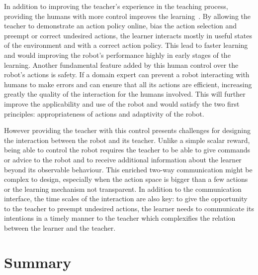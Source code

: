 In addition to improving the teacher's experience in the teaching process, providing the humans with more control improves the learning~\citep{thomaz2008teachable,chernova2009interactive}. By allowing the teacher to demonstrate an action policy online, bias the action selection and preempt or correct undesired actions, the learner interacts mostly in useful states of the environment and with a correct action policy. This lead to faster learning and would improving the robot's performance highly in early stages of the learning. Another fundamental feature added by this human control over the robot's actions is safety. If a domain expert can prevent a robot interacting with humans to make errors and can ensure that all its actions are efficient, increasing greatly the quality of the interaction for the humans involved. This will further improve the applicability and use of the robot and would satisfy the two first principles: appropriateness of actions and adaptivity of the robot.

However providing the teacher with this control presents challenges for designing the interaction between the robot and its teacher. Unlike a simple scalar reward, being able to control the robot requires the teacher to be able to give commands or advice to the robot and to receive additional information about the learner beyond its observable behaviour. This enriched two-way communication might be complex to design, especially when the action space is bigger than a few actions or the learning mechanism not transparent. In addition to the communication interface, the time scales of the interaction are also key: to give the opportunity to the teacher to preempt undesired actions, the learner needs to communicate its intentions in a timely manner to the teacher which complexifies the relation between the learner and the teacher. %




\section{Summary}

